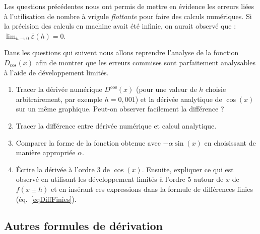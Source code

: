 Les questions précédentes nous ont permis de mettre en évidence
les erreurs liées à l'utilisation de nombre à vrigule \emph{flottante}
pour faire des calculs numériques. Si la précision des calculs en machine
avait été infinie, on aurait observé que :
$\lim_{h\rightarrow 0}\bar{\varepsilon}(h) = 0$.

Dans les questions qui suivent nous allons reprendre l'analyse de la fonction
$D_{\cos} (x)$
afin de montrer que les erreurs commises sont parfaitement analysables
à l'aide de développement limités.

\begin{enumerate}[resume]
\item  Tracer la  dérivée numérique $D^{\cos} (x)$
  (pour une  valeur de  $h$ choisie
  arbitrairement, par exemple $h=0,001$)
  et    la   dérivée   analytique  de $\cos(x)$  sur    un   même
  graphique. Peut-on observer facilement la différence ?
\item  Tracer   la  différence   entre  dérivée  numérique   et  calcul
  analytique.
\item Comparer la forme de  la fonction obtenue avec $-\alpha \sin(x)$
  en choisissant de manière appropriée $\alpha$.
\item Écrire la dérivée à l'ordre 3 de $\cos(x)$.
  Ensuite, expliquer ce qui est
  observé en utilisant les développement limités à l'ordre 5 autour de $x$
  de $f(x\pm h)$ et en insérant ces expressions dans la formule de différences
  finies (éq.~\ref{eqDiffFinies}). 
\end{enumerate}

\subsection{Autres formules de dérivation}

